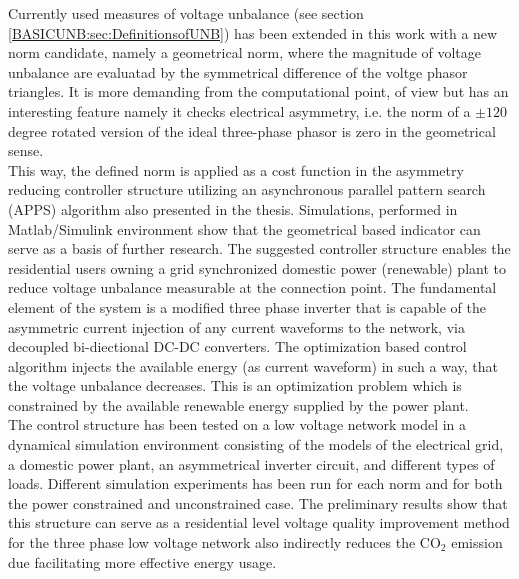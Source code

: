     Currently used measures of voltage unbalance (see section \ref{BASICUNB:sec:DefinitionsofUNB}) has been extended in this work with a new norm candidate, namely a geometrical norm, where the magnitude of voltage unbalance are evaluatad by the symmetrical difference of the voltge phasor triangles. It is more demanding from the computational point, of view but has an interesting feature namely it checks electrical asymmetry, i.e. the norm of a $\pm120$ degree  rotated version of the ideal three-phase phasor is zero in the geometrical sense.\\
    This way, the defined norm is applied as a cost function in the asymmetry reducing controller structure utilizing an asynchronous parallel pattern search (APPS) algorithm also presented in the thesis. Simulations, performed in Matlab/Simulink environment show that the geometrical based indicator can serve as a basis of further research. The suggested controller structure enables the residential users owning a grid synchronized domestic power (renewable) plant to reduce voltage unbalance measurable at the connection point. The fundamental element of the system is a modified three phase inverter that is capable of the asymmetric current injection of any current waveforms to the network, via decoupled bi-diectional DC-DC converters. The optimization based control algorithm injects the available energy (as current waveform) in such a way, that the voltage unbalance decreases. This is an optimization problem which is constrained by the available renewable energy supplied by the power plant.\\
    The control structure has been tested on a low voltage network model in a dynamical simulation environment consisting of the models of the electrical grid, a domestic power plant, an asymmetrical inverter circuit, and different types of loads. Different simulation experiments has been run for each norm and for both the power constrained and unconstrained case. The preliminary results show that this structure can serve as a residential level voltage quality improvement method for the three phase low voltage network also indirectly reduces the CO${}_2$ emission due facilitating more effective energy usage.

